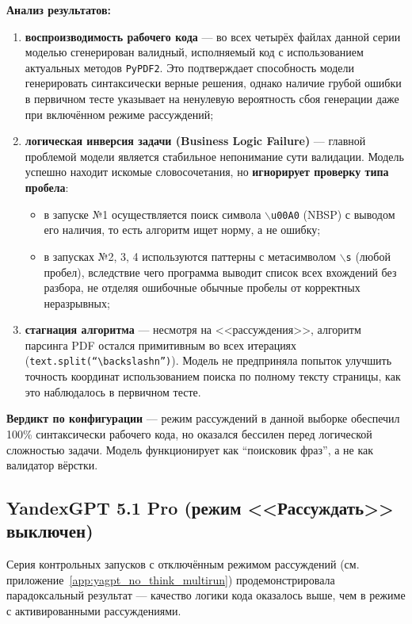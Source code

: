\textbf{Анализ результатов:}
\begin{enumerate}
    \item \textbf{воспроизводимость рабочего кода} --- во всех четырёх файлах данной серии моделью сгенерирован валидный, исполняемый код с использованием актуальных методов \texttt{PyPDF2}. Это подтверждает способность модели генерировать синтаксически верные решения, однако наличие грубой ошибки в первичном тесте указывает на ненулевую вероятность сбоя генерации даже при включённом режиме рассуждений;

    \item \textbf{логическая инверсия задачи (Business Logic Failure)} --- главной проблемой модели является стабильное непонимание сути валидации. Модель успешно находит искомые словосочетания, но \textbf{игнорирует проверку типа пробела}:
    \begin{itemize}
        \item в запуске №1 осуществляется поиск символа \texttt{$\backslash$u00A0} (NBSP) с выводом его наличия, то есть алгоритм ищет норму, а не ошибку;
        \item в запусках №2, 3, 4 используются паттерны с метасимволом \texttt{$\backslash$s} (любой пробел), вследствие чего программа выводит список всех вхождений без разбора, не отделяя ошибочные обычные пробелы от корректных неразрывных;
    \end{itemize}

    \item \textbf{стагнация алгоритма} --- несмотря на <<рассуждения>>, алгоритм парсинга PDF остался примитивным во всех итерациях (\texttt{text.split(``$\backslash$n'')}). Модель не предприняла попыток улучшить точность координат использованием поиска по полному тексту страницы, как это наблюдалось в первичном тесте.
\end{enumerate}

\textbf{Вердикт по конфигурации} --- режим рассуждений в данной выборке обеспечил 100\% синтаксически рабочего кода, но оказался бессилен перед логической сложностью задачи. Модель функционирует как ``поисковик фраз'', а не как валидатор вёрстки.

\subsection{YandexGPT 5.1 Pro (режим <<Рассуждать>> выключен)}

Серия контрольных запусков с отключённым режимом рассуждений (см. приложение~\ref{app:yagpt_no_think_multirun}) продемонстрировала парадоксальный результат --- качество логики кода оказалось выше, чем в режиме с активированными рассуждениями.


